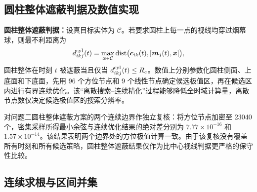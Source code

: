 \documentclass[UTF8,a4paper,12pt,fontset=windows]{ctexart}
\begin{document}
\subsection{圆柱整体遮蔽判据及数值实现}

\textbf{圆柱整体遮蔽判据：}设真目标实体为 $\mathcal C$。若要求圆柱上每一点的视线均穿过烟幕球，则最不利距离为
\begin{equation}
d_{ikj}^{\rm cyl}(t)=\max_{\bm x\in\mathcal C}
\operatorname{dist}\bigl(\bm c_{ik}(t),[\bm m_j(t),\bm x]\bigr),
\label{eq:cylinder-distance}
\end{equation}
圆柱整体在时刻 $t$ 被遮蔽当且仅当 $d_{ikj}^{\rm cyl}(t)\leq R_c$。数值上分别参数化圆柱侧面、上底面和下底面，先用 96 个方位节点和 9 个线性节点确定候选极值区，再在候选区内进行有界连续优化。该“离散搜索--连续精化”过程能够降低全时域计算量\cite{prep}，离散节点数仅决定候选极值区的搜索分辨率。

对问题二圆柱整体遮蔽方案的两个连续边界作独立复核：将方位节点加密至 23040 个，密集采样所得最小余弦与连续优化结果的绝对差分别为 $7.77\times10^{-16}$ 和 $1.57\times10^{-14}$。该结果表明两个边界处的方位极值计算一致。由于该复核没有覆盖所有时刻和所有候选策略，圆柱整体遮蔽结果仅作为比中心视线判据更严格的保守性比较。

\subsection{连续求根与区间并集}
\end{document}

